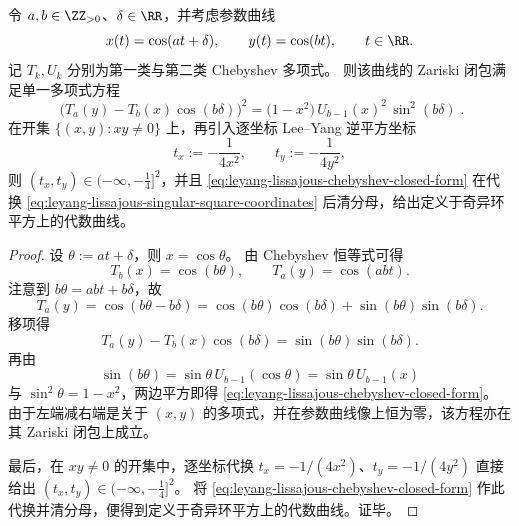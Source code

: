 \begin{theorem}\label{thm:leyang-lissajous-chebyshev-resultant}
令 \(a,b\in\ZZ_{>0}\)、\(\delta\in\RR\)，并考虑参数曲线
\[
x(t)=\cos(at+\delta),\qquad y(t)=\cos(bt),\qquad t\in\RR.
\]
记 \(T_k,U_k\) 分别为第一类与第二类 Chebyshev 多项式。
则该曲线的 Zariski 闭包满足单一多项式方程
\begin{equation}\label{eq:leyang-lissajous-chebyshev-closed-form}
\boxed{\;
\bigl(T_a(y)-T_b(x)\cos(b\delta)\bigr)^2
=
\bigl(1-x^2\bigr)\,U_{b-1}(x)^2\,\sin^2(b\delta)\; }.
\end{equation}
在开集 \(\{(x,y):xy\neq 0\}\) 上，再引入逐坐标 Lee--Yang 逆平方坐标
\begin{equation}\label{eq:leyang-lissajous-singular-square-coordinates}
t_x:=-\frac{1}{4x^2},\qquad
t_y:=-\frac{1}{4y^2},
\end{equation}
则 \((t_x,t_y)\in(-\infty,-\tfrac14]^2\)，并且 \eqref{eq:leyang-lissajous-chebyshev-closed-form} 在代换 \eqref{eq:leyang-lissajous-singular-square-coordinates} 后清分母，给出定义于奇异环平方上的代数曲线。
\end{theorem}
\begin{proof}
设 \(\theta:=at+\delta\)，则 \(x=\cos\theta\)。
由 Chebyshev 恒等式可得
\[
T_b(x)=\cos(b\theta),\qquad T_a(y)=\cos(abt).
\]
注意到 \(b\theta=abt+b\delta\)，故
\[
T_a(y)=\cos(b\theta-b\delta)
=\cos(b\theta)\cos(b\delta)+\sin(b\theta)\sin(b\delta).
\]
移项得
\[
T_a(y)-T_b(x)\cos(b\delta)=\sin(b\theta)\sin(b\delta).
\]
再由
\[
\sin(b\theta)=\sin\theta\,U_{b-1}(\cos\theta)=\sin\theta\,U_{b-1}(x)
\]
与 \(\sin^2\theta=1-x^2\)，两边平方即得 \eqref{eq:leyang-lissajous-chebyshev-closed-form}。
由于左端减右端是关于 \((x,y)\) 的多项式，并在参数曲线像上恒为零，该方程亦在其 Zariski 闭包上成立。

最后，在 \(xy\neq 0\) 的开集中，逐坐标代换 \(t_x=-1/(4x^2)\)、\(t_y=-1/(4y^2)\) 直接给出 \((t_x,t_y)\in(-\infty,-\tfrac14]^2\)。
将 \eqref{eq:leyang-lissajous-chebyshev-closed-form} 作此代换并清分母，便得到定义于奇异环平方上的代数曲线。证毕。
\end{proof}

\endinput
